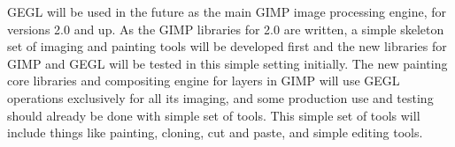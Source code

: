 GEGL will be used in the future as the main GIMP image processing engine, for
versions 2.0 and up.  As the GIMP libraries for 2.0 are written, a simple
skeleton set of imaging and painting tools will be developed first and the new
libraries for GIMP and GEGL will be tested in this simple setting initially. The
new painting core libraries and compositing engine for layers in GIMP will use
GEGL operations exclusively for all its imaging, and some production use and testing
should already be done with simple set of tools. This simple set of tools
will include things like painting, cloning, cut and paste, and simple
editing tools.
